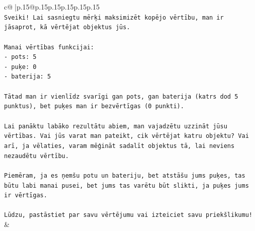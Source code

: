 \documentclass{article}
\begin{document}
{\begin{supertabular}{c@{$\;$}|p{.15\linewidth}@{}p{.15\linewidth}p{.15\linewidth}p{.15\linewidth}p{.15\linewidth}p{.15\linewidth}}
{{{\\ 
\texttt{Sveiki! Lai sasniegtu mērķi maksimizēt kopējo vērtību, man ir jāsaprot, kā vērtējat objektus jūs.} \\
\\ 
\texttt{Manai vērtības funkcijai:} \\
\texttt{{-} pots: 5} \\
\texttt{{-} puķe: 0} \\
\texttt{{-} baterija: 5} \\
\\ 
\texttt{Tātad man ir vienlīdz svarīgi gan pots, gan baterija (katrs dod 5 punktus), bet puķes man ir bezvērtīgas (0 punkti).} \\
\\ 
\texttt{Lai panāktu labāko rezultātu abiem, man vajadzētu uzzināt jūsu vērtības. Vai jūs varat man pateikt, cik vērtējat katru objektu? Vai arī, ja vēlaties, varam mēģināt sadalīt objektus tā, lai neviens nezaudētu vērtību.} \\
\\ 
\texttt{Piemēram, ja es ņemšu potu un bateriju, bet atstāšu jums puķes, tas būtu labi manai pusei, bet jums tas varētu būt slikti, ja puķes jums ir vērtīgas.} \\
\\ 
\texttt{Lūdzu, pastāstiet par savu vērtējumu vai izteiciet savu priekšlikumu!} \\
            }
        }
    }
    & \\ \\


\end{supertabular}}
\end{document}
